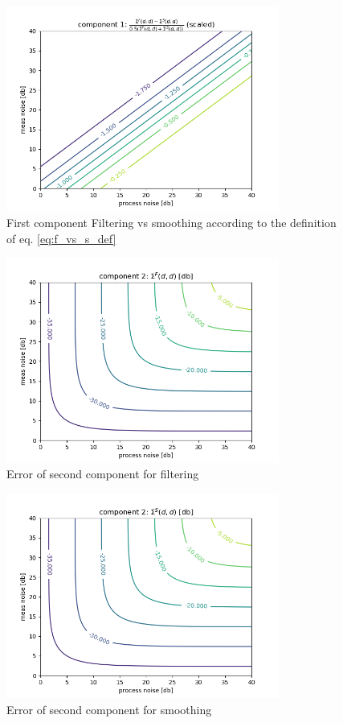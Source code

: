 \documentclass[oneside,12pt]{article}
\begin{document}
\begin{figure}
    \centering
        \includegraphics[width=0.8\textwidth]{./component_1_delta}
        \caption{\label{fig:component_1_delta}First component Filtering vs smoothing according to the definition of eq. \ref{eq:f_vs_s_def}}
\end{figure}
%
%
\begin{figure}
    \centering
        \includegraphics[width=0.8\textwidth]{./component_2_filtering}
        \caption{\label{fig:component_2_filtering}Error of second component for filtering}
\end{figure}
%
%
\begin{figure}
    \centering
        \includegraphics[width=0.8\textwidth]{./component_2_smoothing}
        \caption{\label{fig:component_2_smoothing}Error of second component for smoothing}
\end{figure}
\end{document}
